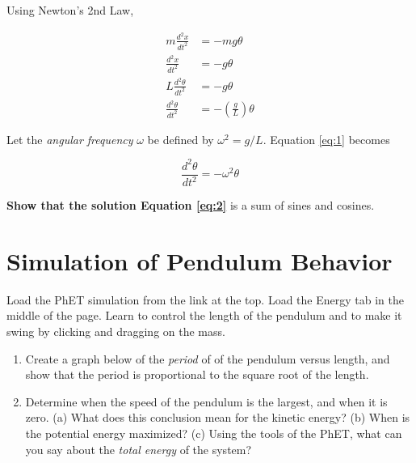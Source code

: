 \documentclass{article}
\begin{document}
Using Newton's 2nd Law,

\begin{align}
m \frac{d^2 x}{dt^2} &= -mg\theta \\
\frac{d^2 x}{dt^2} &= -g\theta \\
L\frac{d^2 \theta}{dt^2} &= -g\theta \\
\frac{d^2 \theta}{dt^2} &= -\left(\frac{g}{L}\right)\theta \label{eq:1}
\end{align}

Let the \textit{angular frequency} $\omega$ be defined by $\omega^2 = g/L$.  Equation \ref{eq:1} becomes

\begin{equation}
\frac{d^2 \theta}{dt^2} = -\omega^2\theta \label{eq:2}
\end{equation}

\textbf{Show that the solution Equation \ref{eq:2}} is a sum of sines and cosines.

\clearpage

\section{Simulation of Pendulum Behavior}

Load the PhET simulation from the link at the top.  Load the Energy tab in the middle of the page.  Learn to control the length of the pendulum and to make it swing by clicking and dragging on the mass.

\begin{enumerate}
\item Create a graph below of the \textit{period} of of the pendulum versus length, and show that the period is proportional to the square root of the length. \\ \vspace{4cm}
\item Determine when the speed of the pendulum is the largest, and when it is zero.  (a) What does this conclusion mean for the kinetic energy?  (b) When is the potential energy maximized?  (c) Using the tools of the PhET, what can you say about the \textit{total energy} of the system?
\end{enumerate}
\end{document}
